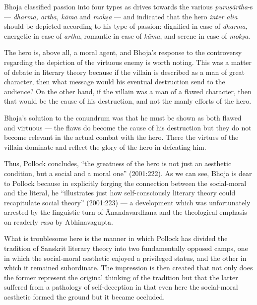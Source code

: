 Bhoja classified passion into four types as drives towards the various \textsl{puruṣārtha}-s --- \textsl{dharma, artha, kāma} and \textsl{mokṣa} --- and indicated that the hero \textsl{inter alia} should be depicted according to his type of passion: dignified in case of \textsl{dharma}, energetic in case of \textsl{artha}, romantic in case of \textsl{kāma}, and serene in case of \textsl{mokṣa}. 


The hero is, above all, a moral agent, and Bhoja's response to the controversy regarding the depiction of the virtuous enemy is worth noting. This was a matter of debate in literary theory because if the villain is described as a man of great character, then what message would his eventual destruction send to the audience? On the other hand, if the villain was a man of a flawed character, then that would be the cause of his destruction, and not the manly efforts of the hero.


Bhoja's solution to the conundrum was that he must be shown as both flawed and virtuous --- the flaws do become the cause of his destruction but they do not become relevant in the actual combat with the hero. There the virtues of the villain dominate and reflect the glory of the hero in defeating him. 
 
Thus, Pollock concludes, ``the greatness of the hero is not just an aesthetic condition, but a social and a moral one'' (2001:222). As we can see, Bhoja is dear to Pollock because in explicitly forging the connection between the social-moral and the literal, he ``illustrates just how self-consciously literary theory could recapitulate social theory'' (2001:223) --- a development which was unfortunately arrested by the linguistic turn of Ānandavardhana and the theological emphasis on readerly \textsl{rasa} by Abhinavagupta.

What is troublesome here is the manner in which Pollock has divided the tradition of Sanskrit literary theory into two fundamentally opposed camps, one in which the social-moral aesthetic enjoyed a privileged status, and the other in which it remained subordinate. The impression is then created that not only does the former represent the original thinking of the tradition but that the latter suffered from a pathology of self-deception in that even here the social-moral aesthetic formed the ground but it became occluded. 

